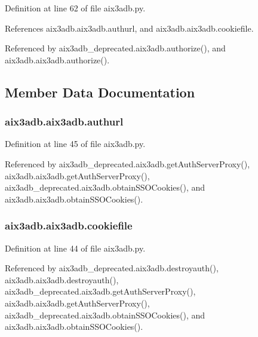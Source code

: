 Definition at line 62 of file aix3adb.\-py.



References aix3adb.\-aix3adb.\-authurl, and aix3adb.\-aix3adb.\-cookiefile.



Referenced by aix3adb\-\_\-deprecated.\-aix3adb.\-authorize(), and aix3adb.\-aix3adb.\-authorize().



\subsection{Member Data Documentation}
\subsubsection[{authurl}]{\setlength{\rightskip}{0pt plus 5cm}aix3adb.\-aix3adb.\-authurl\hspace{0.3cm}{\ttfamily [inherited]}}\label{classaix3adb_1_1aix3adb_a913a05ec4848539c69d6232dc718c415}


Definition at line 45 of file aix3adb.\-py.



Referenced by aix3adb\-\_\-deprecated.\-aix3adb.\-get\-Auth\-Server\-Proxy(), aix3adb.\-aix3adb.\-get\-Auth\-Server\-Proxy(), aix3adb\-\_\-deprecated.\-aix3adb.\-obtain\-S\-S\-O\-Cookies(), and aix3adb.\-aix3adb.\-obtain\-S\-S\-O\-Cookies().

\subsubsection[{cookiefile}]{\setlength{\rightskip}{0pt plus 5cm}aix3adb.\-aix3adb.\-cookiefile\hspace{0.3cm}{\ttfamily [inherited]}}\label{classaix3adb_1_1aix3adb_a91e300fb29d73e97f47e70fd94ff2709}


Definition at line 44 of file aix3adb.\-py.



Referenced by aix3adb\-\_\-deprecated.\-aix3adb.\-destroyauth(), aix3adb.\-aix3adb.\-destroyauth(), aix3adb\-\_\-deprecated.\-aix3adb.\-get\-Auth\-Server\-Proxy(), aix3adb.\-aix3adb.\-get\-Auth\-Server\-Proxy(), aix3adb\-\_\-deprecated.\-aix3adb.\-obtain\-S\-S\-O\-Cookies(), and aix3adb.\-aix3adb.\-obtain\-S\-S\-O\-Cookies().

